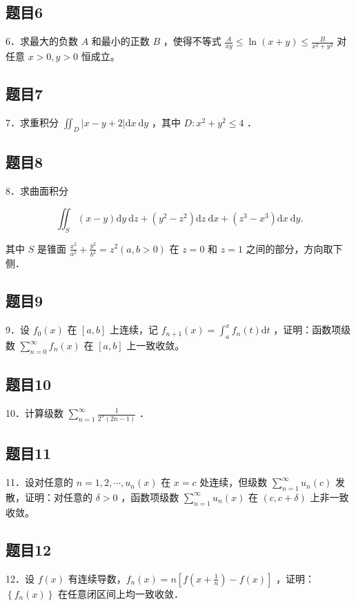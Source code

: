 \documentclass{article}
\begin{document}
\subsection{题目6}
6．求最大的负数 \(A\) 和最小的正数 \(B\) ，使得不等式 \(\frac{A}{x y} \leq \ln (x+y) \leq \frac{B}{x^{2}+y^{2}}\) 对任意 \(x>0, y>0\) 恒成立。

\subsection{题目7}
7．求重积分 \(\iint_{D}|x-y+2| \mathrm{d} x \mathrm{~d} y\) ，其中 \(D: x^{2}+y^{2} \leq 4\) ．

\subsection{题目8}
8．求曲面积分

\[
\iint_{S}(x-y) \mathrm{d} y \mathrm{~d} z+\left(y^{2}-z^{2}\right) \mathrm{d} z \mathrm{~d} x+\left(z^{3}-x^{3}\right) \mathrm{d} x \mathrm{~d} y .
\]

其中 \(S\) 是锥面 \(\frac{x^{2}}{a^{2}}+\frac{y^{2}}{b^{2}}=z^{2}(a, b>0)\) 在 \(z=0\) 和 \(z=1\) 之间的部分，方向取下侧．

\subsection{题目9}
9．设 \(f_{0}(x)\) 在 \([a, b]\) 上连续，记 \(f_{n+1}(x)=\int_{a}^{x} f_{n}(t) \mathrm{d} t\) ，证明：函数项级数 \(\sum_{n=0}^{\infty} f_{n}(x)\) 在 \([a, b]\) 上一致收敛。

\subsection{题目10}
10．计算级数 \(\sum_{n=1}^{\infty} \frac{1}{2^{n}(2 n-1)}\) ．

\subsection{题目11}
11．设对任意的 \(n=1,2, \cdots, u_{n}(x)\) 在 \(x=c\) 处连续，但级数 \(\sum_{n=1}^{\infty} u_{n}(c)\) 发散，证明：对任意的 \(\delta>0\) ，函数项级数 \(\sum_{n=1}^{\infty} u_{n}(x)\) 在 \((c, c+\delta)\) 上非一致收敛。

\subsection{题目12}
12．设 \(f(x)\) 有连续导数，\(f_{n}(x)=n\left[f\left(x+\frac{1}{n}\right)-f(x)\right]\) ，证明：\(\left\{f_{n}(x)\right\}\) 在任意闭区间上均一致收敛．
\end{document}
